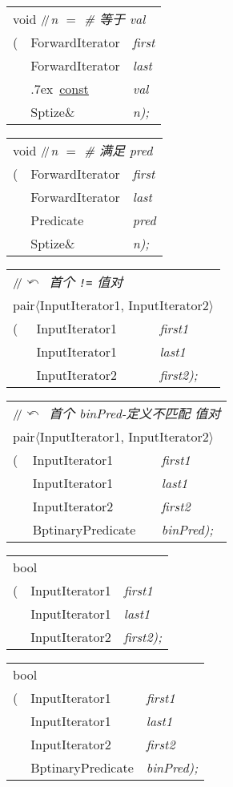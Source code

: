 \documentclass[c5size,landscape,twoside,a4paper]{ctexart}
\makeatletter
\newif\ifafour
\newif\ifletter
\let\ifafour\iftrue
\let\ifletter\iffalse
\newcommand{\<}{\ensuremath{\langle}}
\renewcommand{\>}{\ensuremath{\rangle}}
\newcommand{\TP}[1]{\<#1\>}
\newcommand{\BinaryPredicate}{{{\bbfont B}\hs\concfont inaryPredicate}}
\newcommand{\ForwardIterator}{{\bbfont F}{\concfont orwardIterator}}
\newcommand{\InputIterator}{{\bbfont I}{\concfont nputIterator}}
\newcommand{\Predicate}{{{\bbfont P}\concfont redicate}}
\newcommand{\Size}{{{\bbfont S}\hs\concfont ize}}
\renewcommand{\T}{{\bbfont T}}
\newcommand{\hs}[1][1]{\hskip #1pt}
\newcommand{\slsl}{\ensuremath{/\kern-.2em/}} %
\newcommand{\textComm}[1]{\textsl{\textsf{#1}}}
\newcommand{\Cppslsl}{\enskip\slsl\enskip}
\newcommand{\CppComm}[1]{\Cppslsl\textComm{#1}}
\newcommand{\const}{\mbox{}\raise.7ex\hbox{{%
                    \tiny \underline{\underline{\textsf{const}}}}}\hskip.2em}
\newcommand{\ret}{\ensuremath{\curvearrowleft}}
\newcommand{\commcr}{{\normalfont{,}} \\}
\newcommand{\doColorNamed}[2]{\color[named]{#1}{#2}}
\newcommand{\doColorNamed}[2]{#2}
\newcommand{\StrongClrBf}[1]{{\small\doColorNamed{Red}\textbf{#1}}}
\newenvironment{funcdec}
 { %
   \ifletter
     \setlength{\extrarowheight}{-2pt}
   \else
     \setlength{\extrarowheight}{-4pt}
   \fi
        \setlength{\tabcolsep}{0pt}
   \begin{tabular}{ll @{\quad}>{\slshape}l}}
 {\end{tabular}}
\newcommand{\lp}{(}
\newcommand{\rp}{)}
\newcommand{\parVal}[2]{{\slshape#1}{\textnormal#2}}
\newcommand{\lastPar}[1]{\parVal{#1}{\rp;}}
\makeatother
\begin{document}
\begin{multicols}{4}
\begin{funcdec}
\multicolumn{3}{l}{void 
                   \CppComm{\textsl{n} $=$ \#  等于 \textsl{val}}}\\
\StrongClrBf{count}\lp& \ForwardIterator & first\commcr
                      & \ForwardIterator & last\commcr
                      & \const\ \T       & val\commcr
                      & \Size\&          & \lastPar{n}
\end{funcdec}


\begin{funcdec}
\multicolumn{3}{l}{void 
             \CppComm{\textsl{n} $=$ \#  满足 \textsl{pred}}}\\
\StrongClrBf{count_if}\lp& \ForwardIterator & first\commcr
                        & \ForwardIterator & last\commcr
                        & \Predicate       & pred\commcr
                        & \Size\&          & \lastPar{n}
\end{funcdec}

\begin{funcdec}
\multicolumn{3}{l}{\CppComm{\ret\ 首个 \texttt{!=} 值对}}\\
\multicolumn{3}{l}{pair\TP{\InputIterator1, \InputIterator2}}\\
\StrongClrBf{mismatch}\lp& \InputIterator1 & first1\commcr
                         & \InputIterator1  & last1\commcr
                         & \InputIterator2  & \lastPar{first2}
\end{funcdec}

\begin{funcdec}
\multicolumn{3}{l}{\CppComm{\ret\ 首个 \textsl{binPred}-定义不匹配 值对}}\\
\multicolumn{3}{l}{pair\TP{\InputIterator1, \InputIterator2}}\\
\StrongClrBf{mismatch}\lp& \InputIterator1  & first1\commcr
                         & \InputIterator1  & last1\commcr
                         & \InputIterator2  & first2\commcr
                         & \BinaryPredicate & \lastPar{binPred}
\end{funcdec}


\begin{funcdec}
\multicolumn{3}{l}{bool}\\
\StrongClrBf{equal}\lp& \InputIterator1 & first1\commcr
                      & \InputIterator1 & last1\commcr
                      & \InputIterator2 & \lastPar{first2}
\end{funcdec}

\begin{funcdec}
\multicolumn{3}{l}{bool}\\
\StrongClrBf{equal}\lp& \InputIterator1  & first1\commcr
                      & \InputIterator1  & last1\commcr
                      & \InputIterator2  & first2\commcr
                      & \BinaryPredicate & \lastPar{binPred}
\end{funcdec}



\end{multicols}
\end{document}
